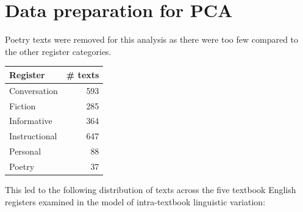 \documentclass[
  letterpaper,
  DIV=11,
  numbers=noendperiod]{scrreprt}
\newenvironment{Shaded}{\begin{snugshade}}{\end{snugshade}}
\newcommand{\AttributeTok}[1]{\textcolor[rgb]{0.40,0.45,0.13}{#1}}
\newcommand{\FunctionTok}[1]{\textcolor[rgb]{0.28,0.35,0.67}{#1}}
\newcommand{\NormalTok}[1]{\textcolor[rgb]{0.00,0.23,0.31}{#1}}
\newcommand{\OtherTok}[1]{\textcolor[rgb]{0.00,0.23,0.31}{#1}}
\newcommand{\SpecialCharTok}[1]{\textcolor[rgb]{0.37,0.37,0.37}{#1}}
\newcommand{\StringTok}[1]{\textcolor[rgb]{0.13,0.47,0.30}{#1}}
\begin{document}
\section{Data preparation for PCA}\label{data-preparation-for-pca}

Poetry texts were removed for this analysis as there were too few
compared to the other register categories.

\begin{Shaded}
\end{Shaded}

\begin{longtable}[]{@{}lr@{}}
\toprule\noalign{}
Register & \# texts \\
\midrule\noalign{}
\endhead
\bottomrule\noalign{}
\endlastfoot
Conversation & 593 \\
Fiction & 285 \\
Informative & 364 \\
Instructional & 647 \\
Personal & 88 \\
Poetry & 37 \\
\end{longtable}

This led to the following distribution of texts across the five textbook
English registers examined in the model of intra-textbook linguistic
variation:

\begin{Shaded}
\end{Shaded}
\end{document}
